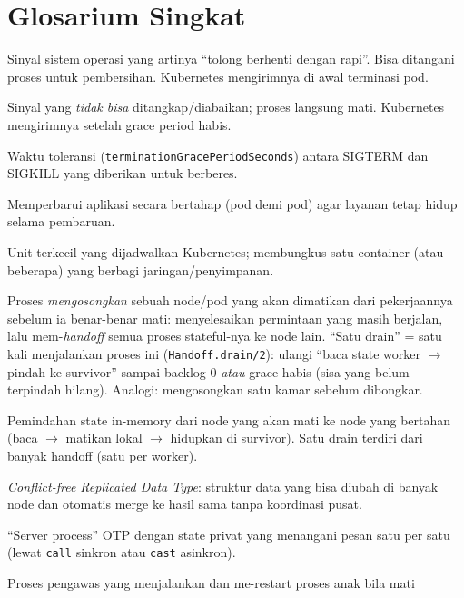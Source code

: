 \documentclass[11pt]{article}
\newcommand{\code}[1]{\texttt{\small #1}}
\begin{document}
\section{Glosarium Singkat}
\label{sec:glosarium}

\begin{description}[leftmargin=1.6em,style=nextline]
  \item[SIGTERM] Sinyal sistem operasi yang artinya ``tolong berhenti dengan rapi''. Bisa ditangani
  proses untuk pembersihan. Kubernetes mengirimnya di awal terminasi pod.
  \item[SIGKILL] Sinyal yang \emph{tidak bisa} ditangkap/diabaikan; proses langsung mati. Kubernetes
  mengirimnya setelah grace period habis.
  \item[grace period] Waktu toleransi (\code{terminationGracePeriodSeconds}) antara SIGTERM dan SIGKILL
  yang diberikan untuk berberes.
  \item[rolling update] Memperbarui aplikasi secara bertahap (pod demi pod) agar layanan tetap hidup
  selama pembaruan.
  \item[pod] Unit terkecil yang dijadwalkan Kubernetes; membungkus satu container (atau beberapa) yang
  berbagi jaringan/penyimpanan.
  \item[drain] Proses \emph{mengosongkan} sebuah node/pod yang akan dimatikan dari pekerjaannya
  sebelum ia benar-benar mati: menyelesaikan permintaan yang masih berjalan, lalu mem-\emph{handoff}
  semua proses stateful-nya ke node lain. ``Satu drain'' = satu kali menjalankan proses ini
  (\code{Handoff.drain/2}): ulangi ``baca state worker $\rightarrow$ pindah ke survivor'' sampai
  backlog 0 \emph{atau} grace habis (sisa yang belum terpindah hilang). Analogi: mengosongkan satu
  kamar sebelum dibongkar.
  \item[handoff] Pemindahan state in-memory dari node yang akan mati ke node yang bertahan
  (baca $\rightarrow$ matikan lokal $\rightarrow$ hidupkan di survivor). Satu drain terdiri dari banyak
  handoff (satu per worker).
  \item[CRDT] \emph{Conflict-free Replicated Data Type}: struktur data yang bisa diubah di banyak node
  dan otomatis merge ke hasil sama tanpa koordinasi pusat.
  \item[GenServer] ``Server process'' OTP dengan state privat yang menangani pesan satu per satu
  (lewat \code{call} sinkron atau \code{cast} asinkron).
  \item[supervisor] Proses pengawas yang menjalankan dan me-restart proses anak bila mati

\end{description}
\end{document}
